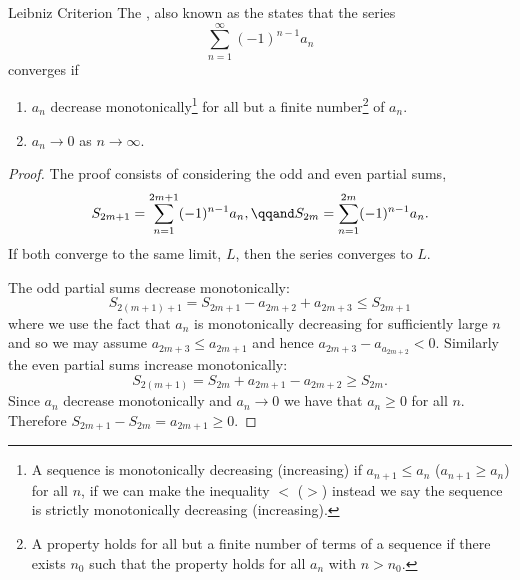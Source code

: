 \documentclass[fleqn]{NotesClass}
\begin{document}
    \begin{lma}{Leibniz Criterion}{}
        The , also known as the  states that the series
        \begin{equation}
            \sum_{n=1}^{\infty} (-1)^{n-1} a_n
        \end{equation}
        converges if
        \begin{enumerate}
            \item \(a_n\) decrease monotonically\footnote{A sequence is monotonically decreasing (increasing) if \(a_{n+1} \le a_{n}\) (\(a_{n+1} \ge a_n\)) for all \(n\), if we can make the inequality \(<\) (\(>\)) instead we say the sequence is strictly monotonically decreasing (increasing).} for all but a finite number\footnote{A property holds for all but a finite number of terms of a sequence if there exists \(n_0\) such that the property holds for all \(a_n\) with \(n > n_0\).} of \(a_n\).
            \item \(a_n \to 0\) as \(n \to \infty\).
        \end{enumerate}
        \begin{proof}
            The proof consists of considering the odd and even partial sums,
            \begin{equation}
                S_{2m+1} = \sum_{n=1}^{2m+1} (-1)^{n-1}a_n, \qqand S_{2m} = \sum_{n=1}^{2m} (-1)^{n-1}a_n.
            \end{equation}
            If both converge to the same limit, \(L\), then the series converges to \(L\).
            
            The odd partial sums decrease monotonically:
            \begin{equation}
                S_{2(m+1)+1} = S_{2m + 1} - a_{2m+2} + a_{2m+3} \le S_{2m+1}
            \end{equation}
            where we use the fact that \(a_n\) is monotonically decreasing for sufficiently large \(n\) and so we may assume \(a_{2m+3} \le a_{2m + 1}\) and hence \(a_{2m+3}-a_{a_{2m+2}} < 0\).
            Similarly the even partial sums increase monotonically:
            \begin{equation}
                S_{2(m+1)} = S_{2m} + a_{2m+1} - a_{2m+2}\ge S_{2m}.
            \end{equation}
            Since \(a_n\) decrease monotonically and \(a_n \to 0\) we have that \(a_n \ge 0\) for all \(n\).
            Therefore \(S_{2m+1} - S_{2m} = a_{2m+1} \ge 0\).
            

\end{proof}
\end{lma}
\end{document}
